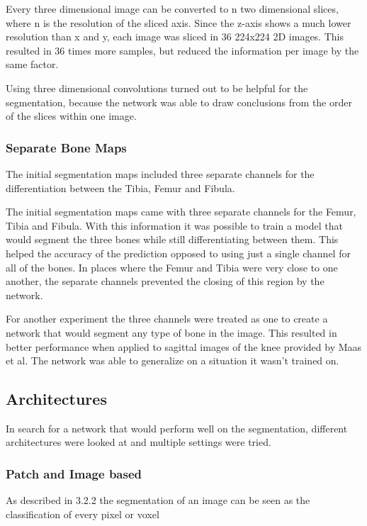 Every three dimensional image can be converted to n two dimensional slices, where n is the resolution of the sliced axis. Since the z-axis shows a much lower resolution than x and y, each image was sliced in 36 224x224 2D images. This resulted in 36 times more samples, but reduced the information per image by the same factor. 

Using three dimensional convolutions turned out to be helpful for the segmentation, because the network was able to draw conclusions from the order of the slices within one image. 

\subsubsection{Separate Bone Maps}

The initial segmentation maps included three separate channels for the differentiation between the Tibia, Femur and Fibula. 

The initial segmentation maps came with three separate channels for the Femur, Tibia and Fibula. With this information it was possible to train a model that would segment the three bones while still differentiating between them. This helped the accuracy of the prediction opposed to using just a single channel for all of the bones. In places where the Femur and Tibia were very close to one another, the separate channels prevented the closing of this region by the network.

For another experiment the three channels were treated as one to create a network that would segment any type of bone in the image. This resulted in better performance when applied to sagittal images of the knee provided by Maas et al. The network was able to generalize on a situation it wasn't trained on.

\subsection{Architectures}



In search for a network that would perform well on the segmentation, different architectures were looked at and multiple settings were tried.

\subsubsection{Patch and Image based}

As described in 3.2.2 the segmentation of an image can be seen as the classification of every pixel or voxel



